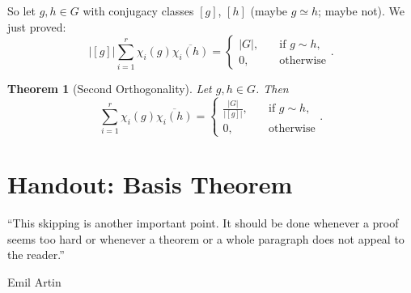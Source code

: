 \documentclass[12pt]{article}
\newtheorem{theorem}{Theorem}[section]
\theoremstyle{definition}
\begin{document}
\begin{enumerate}[start=0]
    So let $g , h \in G$ with conjugacy classes $[g]$, $[h]$ (maybe $g \simeq h$; maybe not). We just proved:
    \begin{equation}
        \left| [g] \right| \sum\limits_{i = 1}^r \chi_i(g) \overline{\chi_i(h)} = 
        \begin{cases}
            |G| , & \quad \text{if }g \sim h ,\\
            0 , & \quad \text{otherwise}
        \end{cases}.
    \end{equation}
    \begin{theorem}[Second Orthogonality]
        Let $g , h \in G$. Then 
        \begin{equation}
            \sum\limits_{i = 1}^r \chi_i(g) \overline{\chi_i(h)} = 
            \begin{cases}
                \frac{|G|}{\left| [g] \right|} , & \quad \text{if }g \sim h ,\\
                0 , & \quad \text{otherwise}
            \end{cases}.
        \end{equation}
    \end{theorem}
\end{enumerate}
\section{Handout: Basis Theorem}
\epigraph{``This skipping is another important point. It should be done whenever a proof seems too hard or whenever a theorem or a whole paragraph does not appeal to the reader.''}{Emil Artin}
\end{document}
